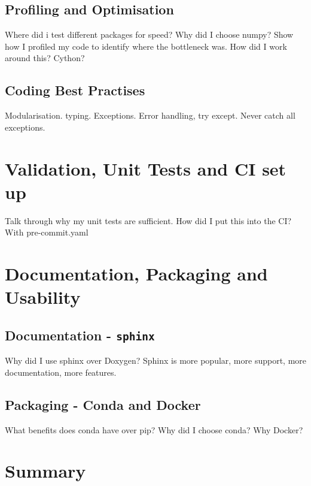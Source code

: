 \documentclass[a4paper,11pt]{article}
\newcommand{\inlinecode}[1]{\lstinline{#1}}
\begin{document}
\subsection{Profiling and Optimisation}\label{subsec:profiling-and-optimisation}
Where did i test different packages for speed? Why did I choose numpy?
Show how I profiled my code to identify where the bottleneck was.
How did I work around this? Cython?

\subsection{Coding Best Practises}\label{subsec:coding-best-practises}
Modularisation.
typing.
Exceptions. Error handling, try except. Never catch all exceptions.


\section{Validation, Unit Tests and CI set up}\label{sec:validation-unit-tests-and-ci-set-up}
Talk through why my unit tests are sufficient.
How did I put this into the CI? With pre-commit.yaml


\section{Documentation, Packaging and Usability}\label{sec:documentation-packaging-and-usability}
\subsection{Documentation - \inlinecode{sphinx}}\label{subsec:documentation-sphinx}
Why did I use sphinx over Doxygen? Sphinx is more popular, more support, more documentation, more features.

\subsection{Packaging - Conda and Docker}\label{subsec:packaging-pypi}
What benefits does conda have over pip? Why did I choose conda?
Why Docker?

\section{Summary}
\label{sec:conclusion}
\end{document}
